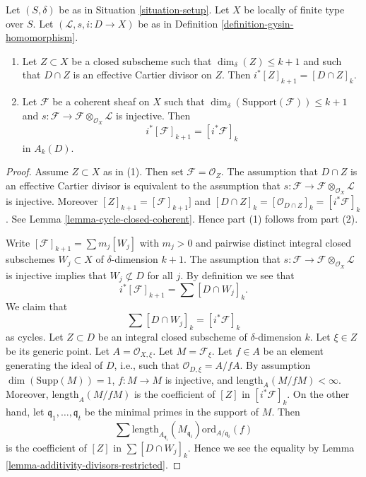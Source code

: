 \begin{lemma}
\label{lemma-easy-gysin}
Let $(S, \delta)$ be as in Situation \ref{situation-setup}.
Let $X$ be locally of finite type over $S$.
Let $(\mathcal{L}, s, i : D \to X)$ be as in
Definition \ref{definition-gysin-homomorphism}.
\begin{enumerate}
\item Let $Z \subset X$ be a closed subscheme such
that $\dim_\delta(Z) \leq k + 1$ and such that
$D \cap Z$ is an effective Cartier divisor on $Z$. Then
$i^*[Z]_{k + 1} = [D \cap Z]_k$.
\item Let $\mathcal{F}$ be a coherent sheaf on $X$
such that $\dim_\delta(\text{Support}(\mathcal{F})) \leq k + 1$ and
$s : \mathcal{F} \to \mathcal{F} \otimes_{\mathcal{O}_X} \mathcal{L}$
is injective. Then
$$
i^*[\mathcal{F}]_{k + 1} = [i^*\mathcal{F}]_k
$$
in $A_k(D)$.
\end{enumerate}
\end{lemma}

\begin{proof}
Assume $Z \subset X$ as in (1). Then set $\mathcal{F} = \mathcal{O}_Z$.
The assumption that $D \cap Z$ is an effective Cartier divisor is
equivalent to the assumption that
$s : \mathcal{F} \to \mathcal{F} \otimes_{\mathcal{O}_X} \mathcal{L}$
is injective. Moreover $[Z]_{k + 1} = [\mathcal{F}]_{k + 1}]$
and $[D \cap Z]_k = [\mathcal{O}_{D \cap Z}]_k = [i^*\mathcal{F}]_k$.
See Lemma \ref{lemma-cycle-closed-coherent}.
Hence part (1) follows from part (2).

\medskip\noindent
Write $[\mathcal{F}]_{k + 1} = \sum m_j[W_j]$ with $m_j > 0$
and pairwise distinct integral closed subschemes $W_j \subset X$
of $\delta$-dimension $k + 1$. The assumption that
$s : \mathcal{F} \to \mathcal{F} \otimes_{\mathcal{O}_X} \mathcal{L}$
is injective implies that $W_j \not \subset D$ for all $j$.
By definition we see that
$$
i^*[\mathcal{F}]_{k + 1} = \sum [D \cap W_j]_k.
$$
We claim that
$$
\sum [D \cap W_j]_k = [i^*\mathcal{F}]_k
$$
as cycles.
Let $Z \subset D$ be an integral closed subscheme of $\delta$-dimension
$k$. Let $\xi \in Z$ be its generic point. Let $A = \mathcal{O}_{X, \xi}$.
Let $M = \mathcal{F}_\xi$. Let $f \in A$ be an element generating the
ideal of $D$, i.e., such that $\mathcal{O}_{D, \xi} = A/fA$.
By assumption $\dim(\text{Supp}(M)) = 1$, $f : M \to M$ is injective, and
$\text{length}_A(M/fM) < \infty$. Moreover, $\text{length}_A(M/fM)$
is the coefficient of $[Z]$ in $[i^*\mathcal{F}]_k$. On the
other hand, let $\mathfrak q_1, \ldots, \mathfrak q_t$ be the minimal
primes in the support of $M$. Then
$$
\sum
\text{length}_{A_{\mathfrak q_i}}(M_{\mathfrak q_i})
\text{ord}_{A/\mathfrak q_i}(f)
$$
is the coefficient of $[Z]$ in $\sum [D \cap W_j]_k$.
Hence we see the equality by
Lemma \ref{lemma-additivity-divisors-restricted}.
\end{proof}








